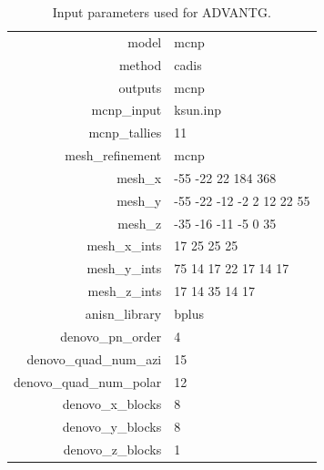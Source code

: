 \begin{table}[h]\centering
\label{tab:advantg_params}
\caption{Input parameters used for ADVANTG.}
\begin{tabular}{ r | l }
\toprule
model                     &   mcnp\\
method                    &   cadis\\
outputs                   &   mcnp\\
mcnp\_input               &   ksun.inp\\
mcnp\_tallies             &   11\\
mesh\_refinement          &   mcnp\\
mesh\_x                   &   -55 -22 22 184 368\\
mesh\_y                   &   -55 -22 -12 -2 2 12 22 55\\
mesh\_z                   &   -35 -16 -11 -5 0 35\\
mesh\_x\_ints             &   17 25 25 25\\
mesh\_y\_ints             &   75 14 17 22 17 14 17\\
mesh\_z\_ints             &   17 14 35 14 17\\
anisn\_library            &   bplus\\
denovo\_pn\_order         &   4\\
denovo\_quad\_num\_azi    &   15\\
denovo\_quad\_num\_polar  &   12\\
denovo\_x\_blocks         &   8\\
denovo\_y\_blocks         &   8\\
denovo\_z\_blocks         &   1\\
\end{tabular}
\end{table}

